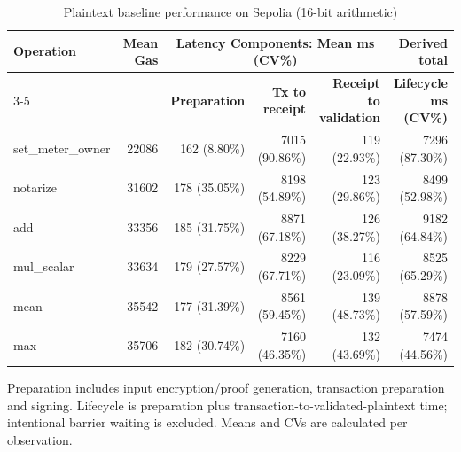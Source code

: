 \begin{table}[!t]
\caption{Plaintext baseline performance on Sepolia (16-bit arithmetic)}
\label{tab:baseline-sepolia-benchmark}
\centering
\scriptsize
\setlength{\tabcolsep}{4pt}
\begin{tabular}{|l|r|rrr|r|}
\hline
\textbf{Operation} &
\textbf{Mean Gas} &
\multicolumn{3}{c|}{\textbf{Latency Components: Mean ms (CV\%)}} &
\textbf{Derived total} \\
\cline{3-5}
& &
\textbf{Preparation} &
\textbf{Tx to receipt} &
\textbf{Receipt to validation} &
\textbf{Lifecycle ms (CV\%)} \\
\hline
set\_meter\_owner & 22086 & 162 (8.80\%) & 7015 (90.86\%) & 119 (22.93\%) & 7296 (87.30\%) \\
notarize & 31602 & 178 (35.05\%) & 8198 (54.89\%) & 123 (29.86\%) & 8499 (52.98\%) \\
add & 33356 & 185 (31.75\%) & 8871 (67.18\%) & 126 (38.27\%) & 9182 (64.84\%) \\
mul\_scalar & 33634 & 179 (27.57\%) & 8229 (67.71\%) & 116 (23.09\%) & 8525 (65.29\%) \\
mean & 35542 & 177 (31.39\%) & 8561 (59.45\%) & 139 (48.73\%) & 8878 (57.59\%) \\
max & 35706 & 182 (30.74\%) & 7160 (46.35\%) & 132 (43.69\%) & 7474 (44.56\%) \\
\hline
\end{tabular}
\vspace{2pt}
\parbox{\textwidth}{\scriptsize Preparation includes input encryption/proof generation, transaction preparation and signing. Lifecycle is preparation plus transaction-to-validated-plaintext time; intentional barrier waiting is excluded. Means and CVs are calculated per observation.}
\end{table}
